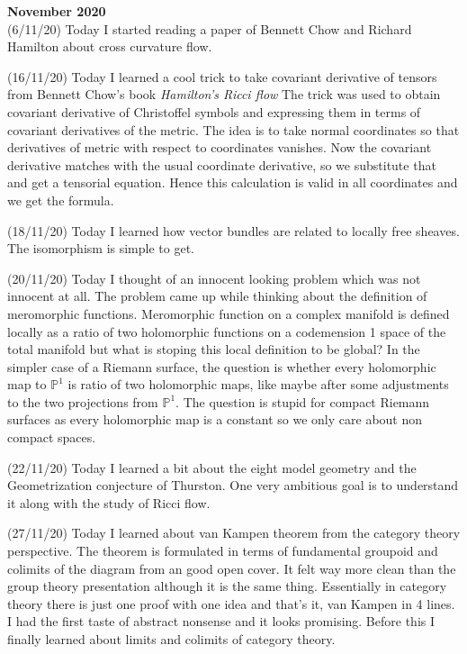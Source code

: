 \documentclass[12pt,a4paper]{article}
\begin{document}
\maketitle\textbf{November 2020}
\\

(6/11/20) Today I started reading a paper of Bennett Chow and Richard Hamilton about cross curvature flow.

(16/11/20) Today I learned a cool trick to take covariant derivative of tensors from Bennett Chow's book \textit{Hamilton's Ricci flow} The trick was used to obtain covariant derivative of Christoffel symbols and expressing them in terms of covariant derivatives of the metric. The idea is to take normal coordinates so that derivatives of metric with respect to coordinates vanishes. Now the covariant derivative matches with the usual coordinate derivative, so we substitute that and get a tensorial equation. Hence this calculation is valid in all coordinates and we get the formula.

(18/11/20) Today I learned how vector bundles are related to locally free sheaves. The isomorphism is simple to get.

(20/11/20) Today I thought of an innocent looking problem which was not innocent at all.  The problem came up while thinking about the definition of meromorphic functions. Meromorphic function on a complex manifold is defined locally as a ratio of two holomorphic functions on a codemension 1 space of the total manifold but what is stoping this local definition to be global? In the simpler case of a Riemann surface, the question is whether every holomorphic map to $\mathbb{P}^1$ is ratio of two holomorphic maps, like maybe after some adjustments to the two projections from $\mathbb{P}^1$. The question is stupid for compact Riemann surfaces as every holomorphic map is a constant so we only care about non compact spaces.

(22/11/20) Today I learned a bit about the eight model geometry and the Geometrization conjecture of Thurston. One very ambitious goal is to understand it along with the study of Ricci flow.

(27/11/20) Today I learned about van Kampen theorem from the category theory perspective. The theorem is formulated in terms of fundamental groupoid and colimits of the diagram from an good open cover. It felt way more clean than the group theory presentation although it is the same thing. Essentially in category theory there is just one proof with one idea and that's it, van Kampen in 4 lines. I had the first taste of abstract nonsense and it looks promising. Before this I finally learned about limits and colimits of category theory.\\ 
\end{document}
